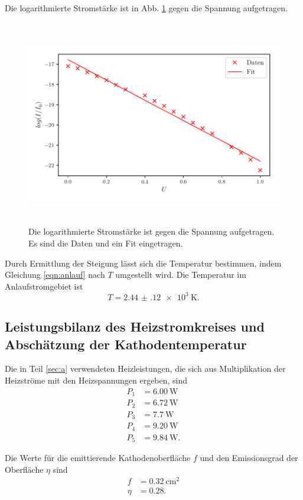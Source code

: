 \noindent Die logarithmierte Stromstärke ist in Abb. \ref{fig:plot3}
gegen die Spannung aufgetragen.
\begin{figure}
    \centering
    \includegraphics[width=15cm, height=9cm]{build/plot3.pdf}
    \caption{Die logarithmierte Stromstärke ist gegen die Spannung aufgetragen.
    Es sind die Daten und ein Fit eingetragen.}
    \label{fig:plot3}
\end{figure}

\noindent Durch Ermittlung der Steigung lässt sich
die Temperatur bestimmen, indem Gleichung \eqref{eqn:anlauf}
nach $T$ umgestellt wird. 
Die Temperatur im Anlaufstromgebiet ist
\begin{equation*}
    T = \SI{2.44(12)e3}{\kelvin}.
\end{equation*}


\subsection{Leistungsbilanz des Heizstromkreises und Abschätzung der Kathodentemperatur}
Die in Teil \ref{sec:a} verwendeten Heizleistungen, die sich 
aus Multiplikation der Heizströme mit den Heizspannungen
ergeben, sind
\begin{align*}
    P_\text{1} &= \SI{6.00}{\watt} \\
    P_\text{2} &= \SI{6.72}{\watt} \\
    P_\text{3} &= \SI{7.7}{\watt} \\
    P_\text{4} &= \SI{9.20}{\watt} \\
    P_\text{5} &= \SI{9.84}{\watt}.
\end{align*}  %

\noindent Die Werte für die emittierende Kathodenoberfläche $f$ und den
Emissionsgrad der Oberfläche $\eta$ sind
\begin{align*}
    f &= \SI{0.32}{\centi\meter\squared} \\
    \eta &= \num{0.28}.
\end{align*}

